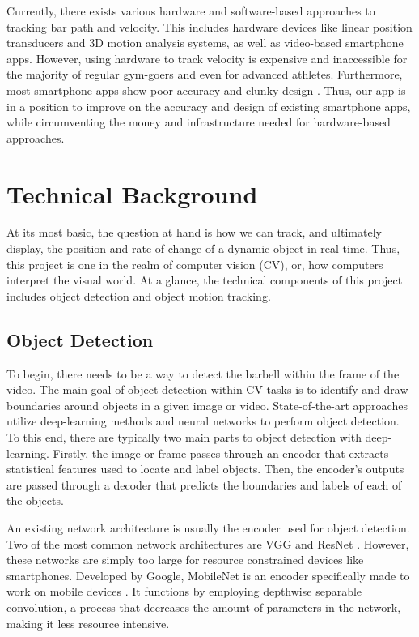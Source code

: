 \documentclass[10pt,twocolumn]{article}
\begin{document}
Currently, there exists various hardware and software-based approaches to tracking bar path and velocity.
This includes hardware devices like linear position transducers and 3D motion analysis systems, as well as video-based smartphone apps. 
However, using hardware to track velocity is expensive and inaccessible for the majority of regular gym-goers and even for advanced athletes. 
Furthermore, most smartphone apps show poor accuracy and clunky design \cite{Martinez-Cava2020, Kasovic2021}.
Thus, our app is in a position to improve on the accuracy and design of existing smartphone apps, while circumventing the money and infrastructure needed for hardware-based approaches. \par

\section{Technical Background}
At its most basic, the question at hand is how we can track, and ultimately display, the position and rate of change of a dynamic object in real time.
Thus, this project is one in the realm of computer vision (CV), or, how computers interpret the visual world. 
At a glance, the technical components of this project includes object detection and object motion tracking.\par

\subsection{Object Detection}
To begin, there needs to be a way to detect the barbell within the frame of the video.
The main goal of object detection within CV tasks is to identify and draw boundaries around objects in a given image or video.
State-of-the-art approaches utilize deep-learning methods and neural networks to perform object detection. 
To this end, there are typically two main parts to object detection with deep-learning.
Firstly, the image or frame passes through an encoder that extracts statistical features used to locate and label objects.
Then, the encoder's outputs are passed through a decoder that predicts the boundaries and labels of each of the objects. \par

An existing network architecture is usually the encoder used for object detection.
Two of the most common network architectures are VGG and ResNet \cite{Simonyan2015,He2016}.
However, these networks are simply too large for resource constrained devices like smartphones.
Developed by Google, MobileNet is an encoder specifically made to work on mobile devices \cite{Howard2017}.
It functions by employing depthwise separable convolution, a process that decreases the amount of parameters in the network, making it less resource intensive. \par
\end{document}
